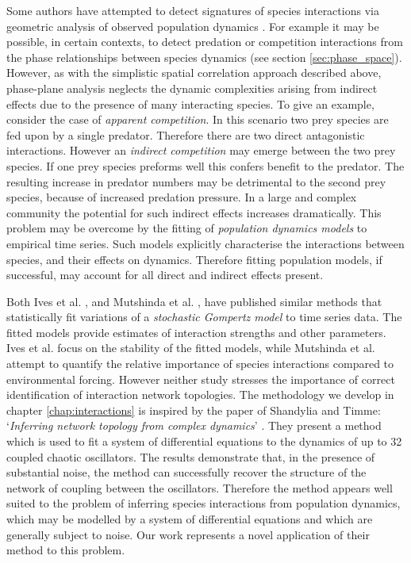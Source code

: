 Some authors have attempted to detect signatures of species interactions via geometric analysis of observed population dynamics \cite{gilpin1973hares,sandvik2004using,froda2009simple}. For example it may be possible, in certain contexts, to detect predation or competition interactions from the phase relationships between species dynamics \cite{sandvik2004using} (see section \ref{sec:phase_space}). However, as with the simplistic spatial correlation approach described above, phase-plane analysis neglects the dynamic complexities arising from indirect effects due to the presence of many interacting species. To give an example, consider the case of \emph{apparent competition}. In this scenario two prey species are fed upon by a single predator. Therefore there are two direct antagonistic interactions. However an \emph{indirect competition} may emerge between the two prey species. If one prey species preforms well this confers benefit to the predator. The resulting increase in predator numbers may be detrimental to the second prey species, because of increased predation pressure. In a large and complex community the potential for such indirect effects increases dramatically. This problem may be overcome by the fitting of \emph{population dynamics models} to empirical time series. Such models explicitly characterise the interactions between species, and their effects on dynamics. Therefore fitting population models, if successful, may account for all direct and indirect effects present.

Both Ives et al. \cite{ives2003estimating}, and Mutshinda et al. \cite{mutshinda2009drives}, have published similar methods that statistically fit variations of a \emph{stochastic Gompertz model} \cite{saitoh1997density} to time series data. The fitted models provide estimates of interaction strengths and other parameters. Ives et al. focus on the stability of the fitted models, while Mutshinda et al. attempt to quantify the relative importance of species interactions compared to environmental forcing. However neither study stresses the importance of correct identification of interaction network topologies. The methodology we develop in chapter \ref{chap:interactions} is inspired by the paper of Shandylia and Timme: `\emph{Inferring network topology from complex dynamics}' \cite{shandilya2011inferring}. They present a method  which is used to fit a system of differential equations to the dynamics of up to 32 coupled chaotic oscillators. The results demonstrate that, in the presence of substantial noise, the method can successfully recover the structure of the network of coupling between the oscillators. Therefore the method appears well suited to the problem of inferring species interactions from population dynamics, which may be modelled by a system of differential equations and which are generally subject to noise. Our work represents a novel application of their method to this problem.

